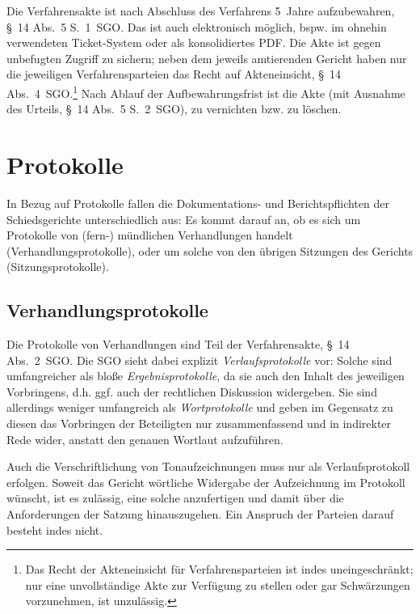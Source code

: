 Die Verfahrensakte ist nach Abschluss des Verfahrens 5~Jahre aufzubewahren, \S~14 Abs.~5 S.~1~SGO.
Das ist auch elektronisch möglich, bspw. im ohnehin verwendeten Ticket-System oder als konsolidiertes PDF.
Die Akte ist gegen unbefugten Zugriff zu sichern; neben dem jeweils amtierenden Gericht haben nur die jeweiligen Verfahrensparteien das Recht auf Akteneinsicht, \S~14 Abs.~4~SGO.\footnote{Das Recht der Akteneinsicht für Verfahrensparteien ist indes uneingeschränkt; nur eine unvollständige Akte zur Verfügung zu stellen oder gar Schwärzungen vorzunehmen, ist unzulässig.}
Nach Ablauf der Aufbewahrungsfrist ist die Akte (mit Ausnahme des Urteils, \S~14 Abs.~5 S.~2~SGO), zu vernichten bzw. zu löschen.

\section{Protokolle}
\label{Dokumentation:Protokolle}
In Bezug auf Protokolle fallen die Dokumentations- und Berichtspflichten der Schiedsgerichte unterschiedlich aus:
Es kommt darauf an, ob es sich um Protokolle von (fern-) mündlichen Verhandlungen handelt (Verhandlungsprotokolle), oder um solche von den übrigen Sitzungen des Gerichts (Sitzungsprotokolle).

\subsection{Verhandlungsprotokolle}
\label{Dokumentation:Protokolle:Verhandlungsprotokolle}
Die Protokolle von Verhandlungen sind Teil der Verfahrensakte, \S~14 Abs.~2~SGO.
Die SGO sieht dabei explizit \emph{Verlaufsprotokolle} vor:
Solche sind umfangreicher als bloße \emph{Ergebnisprotokolle}, da sie auch den Inhalt des jeweiligen Vorbringens, d.h. ggf. auch der rechtlichen Diskussion widergeben.
Sie sind allerdings weniger umfangreich als \emph{Wortprotokolle} und geben im Gegensatz zu diesen das Vorbringen der Beteiligten nur zusammenfassend und in indirekter Rede wider, anstatt den genauen Wortlaut aufzuführen.

Auch die Verschriftlichung von Tonaufzeichnungen muss nur als Verlaufsprotokoll erfolgen.
Soweit das Gericht wörtliche Widergabe der Aufzeichnung im Protokoll wünscht, ist es zulässig, eine solche anzufertigen und damit über die Anforderungen der Satzung hinauszugehen.
Ein Anspruch der Parteien darauf besteht indes nicht.

